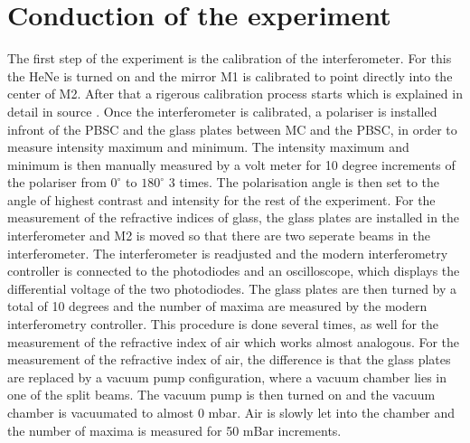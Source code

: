 \section{Conduction of the experiment} 
The first step of the experiment is the calibration of the interferometer. For this the HeNe is turned on and the mirror M1 is calibrated to point directly into the center of M2. After that a rigerous calibration process starts which is explained in detail in source \cite{sample}. Once the interferometer is calibrated, a polariser is installed infront of the PBSC and the glass plates between MC and the PBSC, in order to measure intensity maximum and minimum. The intensity maximum and minimum is then manually measured by a volt meter for 10 degree increments of the polariser from $0^\circ$ to $180^\circ$ 3 times. The polarisation angle is then set to the angle of highest contrast and intensity for the rest of the experiment. For the measurement of the refractive indices of glass, the glass plates are installed in the interferometer and M2 is moved so that there are two seperate beams in the interferometer. The interferometer is readjusted and the modern interferometry controller is connected to the photodiodes and an oscilloscope, which displays the differential voltage of the two photodiodes. The glass plates are then turned by a total of 10 degrees and the number of maxima are measured by the modern interferometry controller. This procedure is done several times, as well for the measurement of the refractive index of air which works almost analogous. For the measurement of the refractive index of air, the difference is that the glass plates are replaced by a vacuum pump configuration, where a vacuum chamber lies in one of the split beams. The vacuum pump is then turned on and the vacuum chamber is vacuumated to almost 0 mbar. Air is slowly let into the chamber and the number of maxima is measured for 50 mBar increments. 

\label{sec:cond}
\newpage